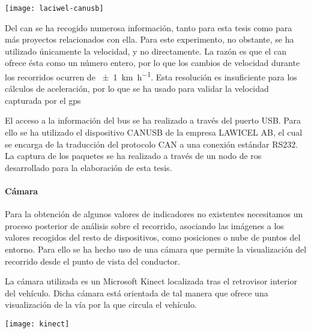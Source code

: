 \begin{marginfigure}
	\centering
	\texttt{[image: laciwel-canusb]}
	\caption[Dispositivo \acrshort{can} BUS de LACIWEL AB]{El dispositivo CANBUS de LACIWEL AB permite el acceso a través del protocolo RS 232 por el puerto USB al bus \ac{can}. Fuente: \url{http://www.can232.com/}.}
	\label{fig:laciwel-canusb}
\end{marginfigure}

Del \Acrshort{can} se ha recogido numerosa información, tanto para esta tesis como para más proyectos relacionados con ella. Para este experimento, no obstante, se ha utilizado únicamente la velocidad, y no directamente. La razón es que el \Acrshort{can} ofrece ésta como un número entero, por lo que los cambios de velocidad durante los recorridos ocurren de \SI{\pm1}{\km\per\hour}. Esta resolución es insuficiente para los cálculos de aceleración, por lo que se ha usado para validar la velocidad capturada por el \Acrshort{gps}

El acceso a la información del bus se ha realizado a través del puerto USB. Para ello se ha utilizado el dispositivo CANUSB de la empresa LAWICEL AB, el cual se encarga de la traducción del protocolo CAN a una conexión estándar RS232. La captura de los paquetes se ha realizado a través de un nodo de \ac{ros} desarrollado para la elaboración de esta tesis.

\paragraph{Cámara}

Para la obtención de algunos valores de indicadores no existentes necesitamos un proceso posterior de análisis sobre el recorrido, asociando las imágenes a los valores recogidos del resto de dispositivos, como posiciones o nube de puntos del entorno. Para ello se ha hecho uso de una cámara que permite la visualización del recorrido desde el punto de vista del conductor.

La cámara utilizada es un Microsoft Kinect localizada tras el retrovisor interior del vehículo. Dicha cámara está orientada de tal manera que ofrece una visualización de la vía por la que circula el vehículo.

\begin{marginfigure}
	\centering
	\texttt{[image: kinect]}
	\caption[Cámara Microsoft Kinect]{La cámara Kinect desarrollada por Microsoft ofrece imágenes a color a una velocidad de \SI{30}{\fps} con una resolución de \SI{640x480}{\px}.}
	\label{fig:kinect}
\end{marginfigure}

